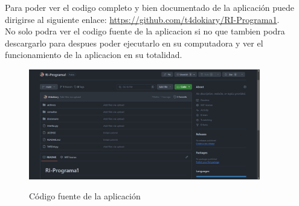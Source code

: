 Para poder ver el codigo completo y bien documentado de la aplicación puede dirigirse al siguiente enlace: \url{https://github.com/t4dokiary/RI-Programa1}.\\
No solo podra ver el codigo fuente de la aplicacion si no que tambien podra descargarlo para despues poder ejecutarlo en su computadora y ver el funcionamiento de la aplicacion en su totalidad. 
\begin{figure}[ht]
  \centering
  \href{https://github.com/t4dokiary/RI-Programa1}{\includegraphics[width=0.9\textwidth]{src/img/codigo/1.png}}
  \caption{Código fuente de la aplicación}
  \label{fig:codigo}
\end{figure}
